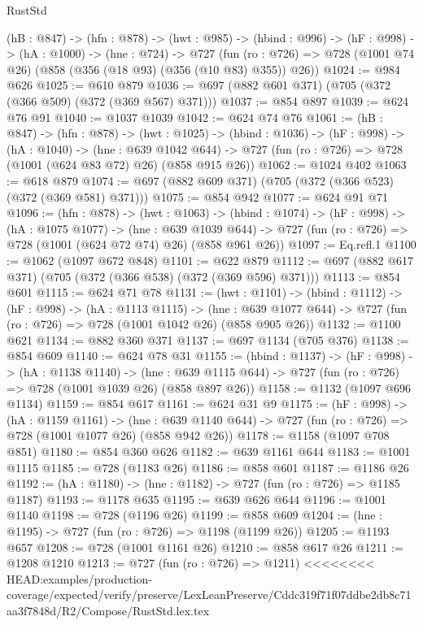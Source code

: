 \begin{lexlean}{RustStd}
\begin{coremodule}
{\begin{coremodule}
  (hB : @847) ->
  (hfn : @878) ->
  (hwt : @985) ->
  (hbind : @996) ->
  (hF : @998) ->
  (hA : @1000) ->
  (hne : @724) ->
  @727 (fun (ro : @726) => @728 (@1001 @74 @26) (@858 (@356 (@18 @93) (@356 (@10 @83) @355)) @26))
@1024 := @984 @626
@1025 := @610 @879
@1036 := @697 (@882 @601 @371) (@705 (@372 (@366 @509) (@372 (@369 @567) @371)))
@1037 := @854 @897
@1039 := @624 @76 @91
@1040 := @1037 @1039
@1042 := @624 @74 @76
@1061 := (hB : @847) ->
  (hfn : @878) ->
  (hwt : @1025) ->
  (hbind : @1036) ->
  (hF : @998) ->
  (hA : @1040) ->
  (hne : @639 @1042 @644) ->
  @727 (fun (ro : @726) => @728 (@1001 (@624 @83 @72) @26) (@858 @915 @26))
@1062 := @1024 @402
@1063 := @618 @879
@1074 := @697 (@882 @609 @371) (@705 (@372 (@366 @523) (@372 (@369 @581) @371)))
@1075 := @854 @942
@1077 := @624 @91 @71
@1096 := (hfn : @878) ->
  (hwt : @1063) ->
  (hbind : @1074) ->
  (hF : @998) ->
  (hA : @1075 @1077) ->
  (hne : @639 @1039 @644) ->
  @727 (fun (ro : @726) => @728 (@1001 (@624 @72 @74) @26) (@858 @961 @26))
@1097 := Eq.refl.{1}
@1100 := @1062 (@1097 @672 @848)
@1101 := @622 @879
@1112 := @697 (@882 @617 @371) (@705 (@372 (@366 @538) (@372 (@369 @596) @371)))
@1113 := @854 @601
@1115 := @624 @71 @78
@1131 := (hwt : @1101) ->
  (hbind : @1112) ->
  (hF : @998) ->
  (hA : @1113 @1115) ->
  (hne : @639 @1077 @644) -> @727 (fun (ro : @726) => @728 (@1001 @1042 @26) (@858 @905 @26))
@1132 := @1100 @621
@1134 := @882 @360 @371
@1137 := @697 @1134 (@705 @376)
@1138 := @854 @609
@1140 := @624 @78 @31
@1155 := (hbind : @1137) ->
  (hF : @998) ->
  (hA : @1138 @1140) ->
  (hne : @639 @1115 @644) -> @727 (fun (ro : @726) => @728 (@1001 @1039 @26) (@858 @897 @26))
@1158 := @1132 (@1097 @696 @1134)
@1159 := @854 @617
@1161 := @624 @31 @9
@1175 := (hF : @998) ->
  (hA : @1159 @1161) ->
  (hne : @639 @1140 @644) -> @727 (fun (ro : @726) => @728 (@1001 @1077 @26) (@858 @942 @26))
@1178 := @1158 (@1097 @708 @851)
@1180 := @854 @360 @626
@1182 := @639 @1161 @644
@1183 := @1001 @1115
@1185 := @728 (@1183 @26)
@1186 := @858 @601
@1187 := @1186 @26
@1192 := (hA : @1180) -> (hne : @1182) -> @727 (fun (ro : @726) => @1185 @1187)
@1193 := @1178 @635
@1195 := @639 @626 @644
@1196 := @1001 @1140
@1198 := @728 (@1196 @26)
@1199 := @858 @609
@1204 := (hne : @1195) -> @727 (fun (ro : @726) => @1198 (@1199 @26))
@1205 := @1193 @657
@1208 := @728 (@1001 @1161 @26)
@1210 := @858 @617 @26
@1211 := @1208 @1210
@1213 := @727 (fun (ro : @726) => @1211)
<<<<<<<< HEAD:examples/production-coverage/expected/verify/preserve/LexLeanPreserve/Cddc319f71f07ddbe2db8c71aa3f7848d/R2/Compose/RustStd.lex.tex

\end{coremodule}}
\end{coremodule}
\end{lexlean}

